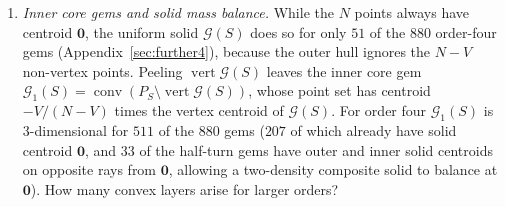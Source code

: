 \begin{enumerate}
\item \emph{Inner core gems and solid mass balance.} While the $N$ points always have centroid $\mathbf 0$, the uniform solid $\mathcal G(S)$ does so for only $51$ of the $880$ order-four gems (Appendix~\ref{sec:further4}), because the outer hull ignores the $N-V$ non-vertex points. Peeling $\operatorname{vert}\mathcal G(S)$ leaves the inner core gem $\mathcal G_1(S)=\operatorname{conv}(P_S\setminus\operatorname{vert}\mathcal G(S))$, whose point set has centroid $-V/(N-V)$ times the vertex centroid of $\mathcal G(S)$. For order four $\mathcal G_1(S)$ is $3$-dimensional for $511$ of the $880$ gems ($207$ of which already have solid centroid $\mathbf 0$, and $33$ of the half-turn gems have outer and inner solid centroids on opposite rays from $\mathbf 0$, allowing a two-density composite solid to balance at $\mathbf 0$). How many convex layers arise for larger orders?
\end{enumerate}
